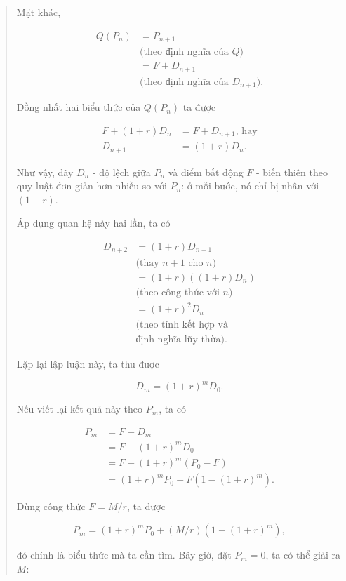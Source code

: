 \documentclass[
  10pt,
  a4paper,
  landscape,
  twoside,
  openany
]{scrbook}
\begin{document}
{\begin{quotation}
Mặt khác,

  \begin{align*}
  Q(P_n)
    &=P_{n+1} \\
      & \text{(theo định nghĩa của $Q$)} \\
    &=F+D_{n+1} \\
      & \text{(theo định nghĩa của $D_{n+1}$).}
  \end{align*}

  Đồng nhất hai biểu thức của $Q(P_n)$ ta được

  \begin{align*}
    F+(1+r)D_n&=F+D_{n+1}, \, \text{hay}\\
    D_{n+1}&=(1+r)D_n.
  \end{align*}

  Như vậy, dãy $D_n$ - độ lệch giữa $P_n$ và điểm bất động $F$ - biến thiên theo quy luật đơn giản hơn nhiều so với $P_n$: ở mỗi bước, nó chỉ bị nhân với $(1+r)$.

  Áp dụng quan hệ này hai lần, ta có

  \begin{align*}
    D_{n+2}
      &=(1+r)D_{n+1} \\
        & \text{(thay $n+1$ cho $n$)} \\
      &=(1+r)((1+r)D_n) \\
        & \text{(theo công thức với $n$)} \\
      &=(1+r)^2D_n \\
        & \text{(theo tính kết hợp và} \\
        & \text{định nghĩa lũy thừa).}
  \end{align*}

  Lặp lại lập luận này, ta thu được

  $$
    D_m = (1 + r)^m D_0.
  $$

  Nếu viết lại kết quả này theo $P_m$, ta có

  \begin{align*}
  P_m
    &=F+D_m \\
    &=F+(1+r)^mD_0 \\
    &=F+(1+r)^m(P_0-F) \\
    &=(1+r)^mP_0+F\left(1-(1+r)^m\right).
  \end{align*}

  Dùng công thức $F=M/r$, ta được

  $$
    P_m=(1+r)^mP_0+(M/r)\left(1-(1+r)^m\right),
  $$

  đó chính là biểu thức mà ta cần tìm. Bây giờ, đặt $P_m=0$, ta có thể giải ra $M$:


\end{quotation}}
\end{document}
